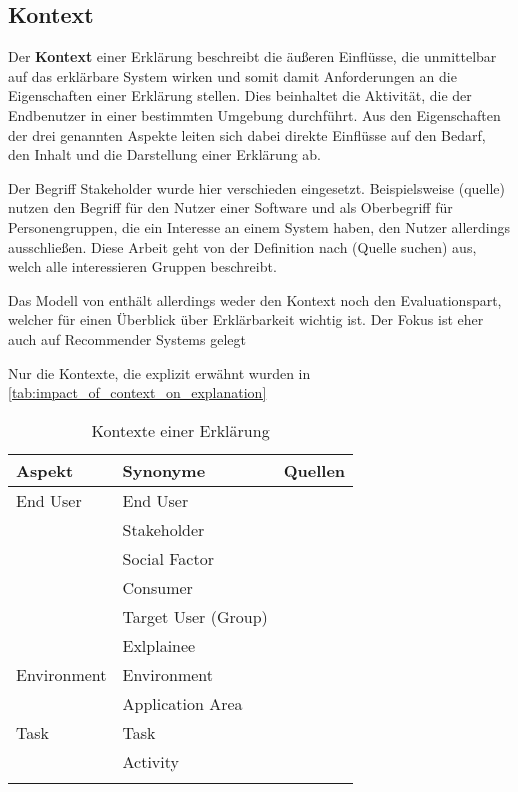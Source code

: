 \subsection{Kontext}

Der \textbf{Kontext} einer Erklärung beschreibt die äußeren Einflüsse, die unmittelbar auf das erklärbare System wirken und somit damit Anforderungen an die Eigenschaften einer Erklärung stellen. Dies beinhaltet die Aktivität, die der Endbenutzer in einer bestimmten Umgebung durchführt. Aus den Eigenschaften der drei genannten Aspekte leiten sich dabei direkte Einflüsse auf den Bedarf, den Inhalt und die Darstellung einer Erklärung ab.

Der Begriff Stakeholder wurde hier verschieden eingesetzt. Beispielsweise (quelle) nutzen den Begriff für den Nutzer einer Software und \cite{nunes_systematic_2017} als Oberbegriff für Personengruppen, die ein Interesse an einem System haben, den Nutzer allerdings ausschließen. Diese Arbeit geht von der Definition nach (Quelle suchen) aus, welch alle interessieren Gruppen beschreibt. 

Das Modell von \cite{nunes_systematic_2017} enthält allerdings weder den Kontext noch den Evaluationspart, welcher für einen Überblick über Erklärbarkeit wichtig ist. Der Fokus ist eher auch auf Recommender Systems gelegt

Nur die Kontexte, die explizit erwähnt wurden in \autoref{tab:impact_of_context_on_explanation}

\begin{longtable}{|p{}|p{}|p{}|}
    \hline
    \textbf{Aspekt} & \textbf{Synonyme} & \textbf{Quellen} \\ \hline
    End User        & End User & \cite{chazette2020explainability} \cite{kaptein_personalised_2017} \cite{sokol_one_2020} \\
                    & Stakeholder & \cite{chazette_knowledge_nodate} \\
                    & Social Factor & \cite{ehsan_human-centered_2020} \\
                    & Consumer & \cite{ehsan_human-centered_2020} \\
                    & Target User (Group) & \cite{chazette2020explainability} \cite{wiegand_id_2020} \\
                    & Exlplainee & \cite{chazette_knowledge_nodate} \\
    \hline
    Environment     & Environment & \cite{chazette_knowledge_nodate} \cite{wiegand_id_2020} \cite{wiegand2019drive} \\
                    & Application Area & \cite{sokol_explainability_2020} \cite{wiegand2019drive} \cite{wiegand_id_2020} \\
    \hline
    Task            & Task & \cite{chazette_knowledge_nodate} \cite{sokol_explainability_2020} \cite{gunning2019darpa} \\
                    & Activity & \cite{wohlin2012experimentation} \\
                    
    \hline
\caption{Kontexte einer Erklärung}
\label{tab:impact_of_context_on_explanation}
\end{longtable}

